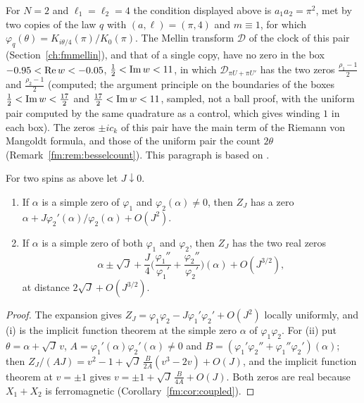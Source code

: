 \begin{resultpar}\label{fm:res:besselmellin}For $N=2$ and $\ell_1=\ell_2=4$ the condition displayed above is $a_1a_2=\pi^2$, met by two copies of the law $q$ with $(a,\ell)=(\pi,4)$ and $m\equiv1$, for which $\varphi_q(\theta)=K_{i\theta/4}(\pi)/K_0(\pi)$. The Mellin transform $\mathcal D$ of the clock of this pair (Section~\ref{ch:fmmellin}), and that of a single copy, have no zero in the box $-0.95<\operatorname{Re} w<-0.05$, $\frac12<\operatorname{Im} w<11$, in which $\mathcal D_{\pi U+\pi U'}$ has the two zeros $\frac{\rho_1-1}2$ and $\frac{\rho_2-1}2$ (computed; the argument principle on the boundaries of the boxes $\frac12<\operatorname{Im} w<\frac{17}2$ and $\frac{17}2<\operatorname{Im} w<11$, sampled, not a ball proof, with the uniform pair computed by the same quadrature as a control, which gives winding $1$ in each box). The zeros $\pm ic_k$ of this pair have the main term of the Riemann von Mangoldt formula, and those of the uniform pair the count $2\theta$ (Remark~\ref{fm:rem:besselcount}). This paragraph is based on \cite{P26tus}.\end{resultpar}

\begin{proposition}\label{fm:prop:levelrep}
For two spins as above let $J\downarrow0$.
\begin{enumerate}
\item[(i)] If $\alpha$ is a simple zero of $\varphi_1$ and $\varphi_2(\alpha)\ne0$, then $Z_J$ has a zero $\alpha+J\varphi_2'(\alpha)/\varphi_2(\alpha)+O(J^2)$.
\item[(ii)] If $\alpha$ is a simple zero of both $\varphi_1$ and $\varphi_2$, then $Z_J$ has the two real zeros
\[
\alpha\pm\sqrt J+\frac J4\Big(\frac{\varphi_1''}{\varphi_1'}+\frac{\varphi_2''}{\varphi_2'}\Big)(\alpha)+O(J^{3/2}),
\]
at distance $2\sqrt J+O(J^{3/2})$.
\end{enumerate}
\end{proposition}

\begin{proof}
The expansion gives $Z_J=\varphi_1\varphi_2-J\varphi_1'\varphi_2'+O(J^2)$ locally uniformly, and (i) is the implicit function theorem at the simple zero $\alpha$ of $\varphi_1\varphi_2$. For (ii) put $\theta=\alpha+\sqrt J\,v$, $A=\varphi_1'(\alpha)\varphi_2'(\alpha)\ne0$ and $B=(\varphi_1'\varphi_2''+\varphi_1''\varphi_2')(\alpha)$; then $Z_J/(AJ)=v^2-1+\sqrt J\,\frac B{2A}(v^3-2v)+O(J)$, and the implicit function theorem at $v=\pm1$ gives $v=\pm1+\sqrt J\,\frac B{4A}+O(J)$. Both zeros are real because $X_1+X_2$ is ferromagnetic (Corollary~\ref{fm:cor:coupled}).
\end{proof}

